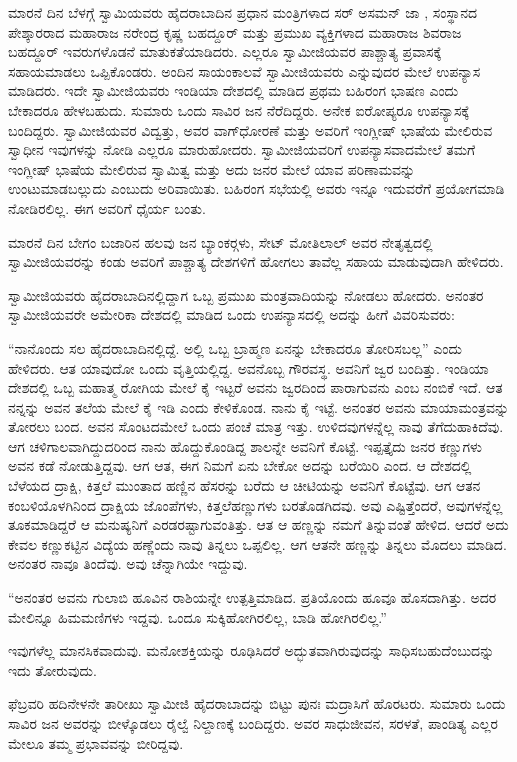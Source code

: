  ಮಾರನೆ ದಿನ ಬೆಳಗ್ಗೆ ಸ್ವಾಮಿಯವರು ಹೈದರಾಬಾದಿನ ಪ್ರಧಾನ ಮಂತ್ರಿಗಳಾದ ಸರ್ ಅಸಮನ್ ಜಾ , ಸಂಸ್ಥಾನದ ಪೇಶ್ಕಾರರಾದ ಮಹಾರಾಜ ನರೇಂದ್ರ ಕೃಷ್ಣ ಬಹದ್ದೂರ್ ಮತ್ತು ಪ್ರಮುಖ ವ್ಯಕ್ತಿಗಳಾದ ಮಹಾರಾಜ ಶಿವರಾಜ ಬಹದ್ದೂರ್ ಇವರುಗಳೊಡನೆ ಮಾತುಕತೆಯಾಡಿದರು. ಎಲ್ಲರೂ ಸ್ವಾಮೀಜಿಯವರ ಪಾಶ್ಚಾತ್ಯ ಪ್ರವಾಸಕ್ಕೆ ಸಹಾಯಮಾಡಲು ಒಪ್ಪಿಕೊಂಡರು. ಅಂದಿನ ಸಾಯಂಕಾಲವೆ ಸ್ವಾಮೀಜಿಯವರು  ಎನ್ನುವುದರ ಮೇಲೆ ಉಪನ್ಯಾಸ ಮಾಡಿದರು. ಇದೇ ಸ್ವಾಮೀಜಿಯವರು ಇಂಡಿಯಾ ದೇಶದಲ್ಲಿ ಮಾಡಿದ ಪ್ರಥಮ ಬಹಿರಂಗ ಭಾಷಣ ಎಂದು ಬೇಕಾದರೂ ಹೇಳಬಹುದು. ಸುಮಾರು ಒಂದು ಸಾವಿರ ಜನ ನೆರೆದಿದ್ದರು. ಅನೇಕ ಐರೋಪ್ಯರೂ ಉಪನ್ಯಾಸಕ್ಕೆ ಬಂದಿದ್ದರು. ಸ್ವಾಮೀಜಿಯವರ ವಿದ್ವತ್ತು, ಅವರ ವಾಗ್‍ಧೋರಣೆ ಮತ್ತು ಅವರಿಗೆ ಇಂಗ್ಲೀಷ್ ಭಾಷೆಯ ಮೇಲಿರುವ ಸ್ವಾಧೀನ ಇವುಗಳನ್ನು ನೋಡಿ ಎಲ್ಲರೂ ಮಾರುಹೋದರು. ಸ್ವಾಮೀಜಿಯವರಿಗೆ ಉಪನ್ಯಾಸವಾದಮೇಲೆ ತಮಗೆ ಇಂಗ್ಲೀಷ್ ಭಾಷೆಯ ಮೇಲಿರುವ ಸ್ವಾಮಿತ್ವ ಮತ್ತು ಅದು ಜನರ ಮೇಲೆ ಯಾವ ಪರಿಣಾಮವನ್ನು ಉಂಟುಮಾಡಬಲ್ಲುದು ಎಂಬುದು ಅರಿವಾಯಿತು. ಬಹಿರಂಗ ಸಭೆಯಲ್ಲಿ ಅವರು ಇನ್ನೂ ಇದುವರೆಗೆ ಪ್ರಯೋಗಮಾಡಿ ನೋಡಿರಲಿಲ್ಲ. ಈಗ ಅವರಿಗೆ ಧೈರ್ಯ ಬಂತು.

 ಮಾರನೆ ದಿನ ಬೇಗಂ ಬಜಾರಿನ ಹಲವು ಜನ ಬ್ಯಾಂಕರ್‍ಗಳು, ಸೇಟ್ ಮೋತಿ‍ಲಾಲ್ ಅವರ ನೇತೃತ್ವದಲ್ಲಿ ಸ್ವಾಮೀಜಿಯವರನ್ನು ಕಂಡು ಅವರಿಗೆ ಪಾಶ್ಚಾತ್ಯ ದೇಶಗಳಿಗೆ ಹೋಗಲು ತಾವೆಲ್ಲ ಸಹಾಯ ಮಾಡುವುದಾಗಿ ಹೇಳಿದರು. 

 ಸ್ವಾಮೀಜಿಯವರು ಹೈದರಾಬಾದಿನಲ್ಲಿದ್ದಾಗ ಒಬ್ಬ ಪ್ರಮುಖ ಮಂತ್ರವಾದಿಯನ್ನು ನೋಡಲು ಹೋದರು. ಅನಂತರ ಸ್ವಾಮೀಜಿಯವರೇ ಅಮೇರಿಕಾ ದೇಶದಲ್ಲಿ ಮಾಡಿದ ಒಂದು ಉಪನ್ಯಾಸದಲ್ಲಿ ಅದನ್ನು ಹೀಗೆ ವಿವರಿಸುವರು: 

 “ನಾನೊಂದು ಸಲ ಹೈದರಾಬಾದಿನಲ್ಲಿದ್ದೆ. ಅಲ್ಲಿ ಒಬ್ಬ ಬ್ರಾಹ್ಮಣ ಏನನ್ನು ಬೇಕಾದರೂ ತೋರಿಸಬಲ್ಲ” ಎಂದು ಹೇಳಿದರು. ಆತ ಯಾವುದೋ ಒಂದು ವೃತ್ತಿಯಲ್ಲಿದ್ದ. ಅವನೊಬ್ಬ ಗೌರವಸ್ಥ. ಅವನಿಗೆ ಜ್ವರ ಬಂದಿತ್ತು. ಇಂಡಿಯಾ ದೇಶದಲ್ಲಿ ಒಬ್ಬ ಮಹಾತ್ಮ ರೋಗಿಯ ಮೇಲೆ ಕೈ ಇಟ್ಟರೆ ಅವನು ಜ್ವರದಿಂದ ಪಾರಾಗುವನು ಎಂಬ ನಂಬಿಕೆ ಇದೆ. ಆತ ನನ್ನನ್ನು ಅವನ ತಲೆಯ ಮೇಲೆ ಕೈ ಇಡಿ ಎಂದು ಕೇಳಿಕೊಂಡ. ನಾನು ಕೈ ಇಟ್ಟೆ. ಅನಂತರ ಅವನು ಮಾಯಾಮಂತ್ರವನ್ನು ತೋರಲು ಬಂದ. ಅವನ ಸೊಂಟದಮೇಲೆ ಒಂದು ಪಂಚೆ ಮಾತ್ರ ಇತ್ತು. ಉಳಿದವುಗಳನ್ನೆಲ್ಲ ನಾವು ತೆಗೆದುಹಾಕಿದೆವು. ಆಗ ಚಳಿಗಾಲವಾಗಿದ್ದುದರಿಂದ ನಾನು ಹೊದ್ದುಕೊಂಡಿದ್ದ ಶಾಲನ್ನೇ ಅವನಿಗೆ ಕೊಟ್ಟೆ. ಇಪ್ಪತ್ತೈದು ಜನರ ಕಣ್ಣುಗಳು ಅವನ ಕಡೆ ನೋಡುತ್ತಿದ್ದವು. ಆಗ ಆತ, ಈಗ ನಿಮಗೆ ಏನು ಬೇಕೋ ಅದನ್ನು ಬರೆಯಿರಿ ಎಂದ. ಆ ದೇಶದಲ್ಲಿ ಬೆಳೆಯದ ದ್ರಾಕ್ಷಿ, ಕಿತ್ತಲೆ ಮುಂತಾದ ಹಣ್ಣಿನ ಹೆಸರನ್ನು ಬರೆದು ಆ ಚೀಟಿಯನ್ನು ಅವನಿಗೆ ಕೊಟ್ಟೆವು. ಆಗ ಆತನ ಕಂಬಳಿಯೊಳಗಿನಿಂದ ದ್ರಾಕ್ಷಿಯ ಜೊಂಪೆಗಳು, ಕಿತ್ತಲೆಹಣ್ಣುಗಳು ಬರತೊಡಗಿದವು. ಅವು ಎಷ್ಟಿತ್ತೆಂದರೆ, ಅವುಗಳನ್ನೆಲ್ಲ ತೂಕಮಾಡಿದ್ದರೆ ಆ ಮನುಷ್ಯನಿಗೆ ಎರಡರಷ್ಟಾಗುವಂತಿತ್ತು. ಆತ ಆ ಹಣ್ಣನ್ನು ನಮಗೆ ತಿನ್ನುವಂತೆ ಹೇಳಿದ. ಆದರೆ ಅದು ಕೇವಲ ಕಣ್ಣುಕಟ್ಟಿನ ವಿದ್ಯೆಯ ಹಣ್ಣೆಂದು ನಾವು ತಿನ್ನಲು ಒಪ್ಪಲಿಲ್ಲ. ಆಗ ಆತನೇ ಹಣ್ಣನ್ನು ತಿನ್ನಲು ಮೊದಲು ಮಾಡಿದ. ಅನಂತರ ನಾವೂ ತಿಂದೆವು. ಅವು ಚೆನ್ನಾಗಿಯೇ ಇದ್ದುವು. 

 “ಅನಂತರ ಅವನು ಗುಲಾಬಿ ಹೂವಿನ ರಾಶಿಯನ್ನೇ ಉತ್ಪತ್ತಿಮಾಡಿದ. ಪ್ರತಿಯೊಂದು ಹೂವೂ ಹೊಸದಾಗಿತ್ತು. ಅದರ ಮೇಲಿನ್ನೂ ಹಿಮಮಣಿಗಳು ಇದ್ದವು. ಒಂದೂ ಸುಕ್ಕಿಹೋಗಿರಲಿಲ್ಲ, ಬಾಡಿ ಹೋಗಿರಲಿಲ್ಲ.” 

 ಇವುಗಳೆಲ್ಲ ಮಾನಸಿಕವಾದುವು. ಮನೋಶಕ್ತಿಯನ್ನು ರೂಢಿಸಿದರೆ ಅದ್ಭುತವಾಗಿರುವುದನ್ನು ಸಾಧಿಸಬಹುದೆಂಬುದನ್ನು ಇದು ತೋರುವುದು.

 ಫೆಬ್ರವರಿ ಹದಿನೇಳನೇ ತಾರೀಖು ಸ್ವಾಮೀಜಿ ಹೈದರಾಬಾದನ್ನು ಬಿಟ್ಟು ಪುನಃ ಮದ್ರಾಸಿಗೆ ಹೊರಟರು. ಸುಮಾರು ಒಂದು ಸಾವಿರ ಜನ ಅವರನ್ನು ಬೀಳ್ಕೊಡಲು ರೈಲ್ವೆ ನಿಲ್ದಾಣಕ್ಕೆ ಬಂದಿದ್ದರು. ಅವರ ಸಾಧುಜೀವನ, ಸರಳತೆ, ಪಾಂಡಿತ್ಯ ಎಲ್ಲರ ಮೇಲೂ ತಮ್ಮ ಪ್ರಭಾವವನ್ನು ಬೀರಿದ್ದವು. 

